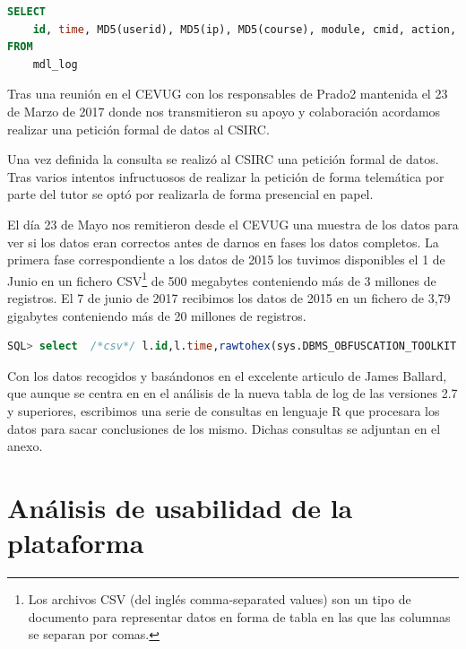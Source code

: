 \begin{lstlisting}[language=sql]
SELECT
    id, time, MD5(userid), MD5(ip), MD5(course), module, cmid, action, url, info
FROM
    mdl_log
\end{lstlisting}


Tras una reunión en el CEVUG con los responsables de Prado2 mantenida el 23 de Marzo de 2017 donde nos transmitieron su apoyo y colaboración acordamos realizar una petición formal de datos al CSIRC.

Una vez definida la consulta se realizó al CSIRC una petición formal de datos. Tras varios intentos infructuosos de realizar la petición de forma telemática por parte del tutor se optó por realizarla de forma presencial en papel.

El día 23 de Mayo nos remitieron desde el CEVUG una muestra de los datos para ver si los datos eran correctos antes de darnos en fases los datos completos. La primera fase correspondiente a los datos de 2015 los tuvimos disponibles el 1 de Junio en un fichero CSV\footnote{Los archivos CSV (del inglés comma-separated values) son un tipo de documento para representar datos en forma de tabla en las que las columnas se separan por comas.} de 500 megabytes conteniendo más de 3 millones de registros. El 7 de junio de 2017 recibimos los datos de 2015 en un fichero de 3,79 gigabytes conteniendo más de 20 millones de registros.

\begin{lstlisting}[language=sql]
SQL> select  /*csv*/ l.id,l.time,rawtohex(sys.DBMS_OBFUSCATION_TOOLKIT.MD5(INPUT_STRING => l.userid)) userid_md5,rawtohex(sys.DBMS_OBFUSCATION_TOOLKIT.MD5(INPUT_STRING => l.ip)) ip_md5 ,l.course, substr(c.idnumber,0,14) course_code,substr(c.idnumber,0,3) tit, substr(c.idnumber,5,2) plan, substr(c.idnumber,8,2) cea, l.module,l.cmid, l.action, l.url, l.info from p_log l, p_course c where (l.course=c.id and l.userid>10 and REGEXP_LIKE(c.idnumber, '^[0-9]') and  l.time>1420070400 and l.time<1451606400);

\end{lstlisting}

Con los datos recogidos y basándonos en el excelente articulo\cite{art_02} de James Ballard, que aunque se centra en en el análisis de la nueva tabla de log de las versiones 2.7 y superiores, escribimos una serie de consultas en lenguaje R que procesara los datos para sacar conclusiones de los mismo. Dichas consultas se adjuntan en el anexo.

\section{Análisis de usabilidad de la plataforma}

